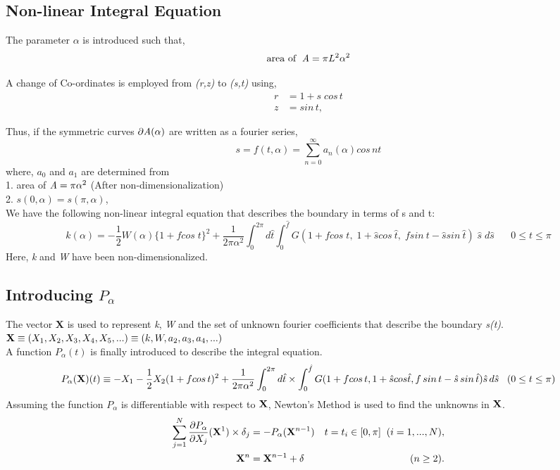 \documentclass[10pt,a4paper,final]{report}
\begin{document}
\subsection{Non-linear Integral Equation}
The parameter $\alpha$ is introduced such that,
\begin{equation}
\text{area of }\;\emph{A}= \pi L^2 \alpha^2
\end{equation}

A change of Co-ordinates is employed from \emph{(r,z)} to \emph{(s,t)} using, 
\begin{align*}
	r &= 1 + s\; cos\,t  \\
	z &= sin\,t,
\end{align*}

Thus, if the symmetric curves $\partial \emph{A} (\alpha) $ are written as a fourier series,
\[
	s = f(t,\alpha) = \sum_{n=0}^{\infty} a_n(\alpha) cos \, nt
\]
where, $a_0$ and $a_1$ are determined from \\
1. area of $\emph{A} = \pi \alpha^2$ (After non-dimensionalization) \\
2. $s(0,\alpha) = s(\pi, \alpha)$, \\
%
We have the following non-linear integral equation that describes the boundary in terms of s and t:
\begin{equation}
k(\alpha) = -\frac{1}{2} W(\alpha)\{1 + f cos\;t\}^2 + 
\frac{1}{2\pi\alpha^2} \int_0^{2\pi} d\hat{t} \int_0^{\hat{f}}
 G(1 + f cos\;t,\; 1 + \hat{s}cos \:\hat{t}, \; f sin\: t - 
 \hat{s} sin\: \hat{t}) \; \hat{s} \; d\hat{s}  \;\;\;\;\;\; 0 \leq t \leq \pi   
\end{equation}
% 
Here, \emph{k} and \emph{W} have been non-dimensionalized.
%
\subsection{Introducing $P_\alpha$}
%
The vector {\bf X} is used to represent \emph{k}, \emph{W} and the set of unknown fourier coefficients that describe the boundary \emph{s(t)}. 
\\
$ {\bf X} \equiv (X_1, X_2, X_3, X_4, X_5,...) \equiv ({k},{W},{a_2}, {a_3}, {a_4}, ...)$
\\
%
A function $P_\alpha(t) $ is finally introduced to describe the integral equation. 
%
\begin{equation}
P_\alpha({\bf X}) (t) \equiv - X_1 - \frac{1}{2} X_2 (1 + {f} cos\, t)^2 + \frac{1}{2\pi\alpha^2} \int_0^{2\pi} 
d\hat{t} \times \int_0^{{\hat{f}}} G(1+ {f} cos\, t, 1 + \hat{s} cos \hat{t}, {f} \,sin \, t - \hat{s}\, 
sin\,\hat{t}) \hat{s} \, d\hat{s}  \;\;\;  (0\leq t \leq\pi)
\end{equation}
Assuming the function $P_\alpha$ is differentiable with respect to ${\bf X}$, Newton's Method is used to find the unknowns in ${\bf X}$.
\begin{align}
	\sum_{j=1}^N \frac{\partial P_\alpha}{\partial X_j} ({\bf X}^1) \times \delta_j &= -P_\alpha({\bf {X}}^{n-1}) & t = t_i \in [0, \pi] \;\; (i = 1, ..., N), \\
	{\bf {X}}^n &= {\bf {X}}^{n-1} + {\delta} & (n\geq 2).
\end{align}
\end{document}
